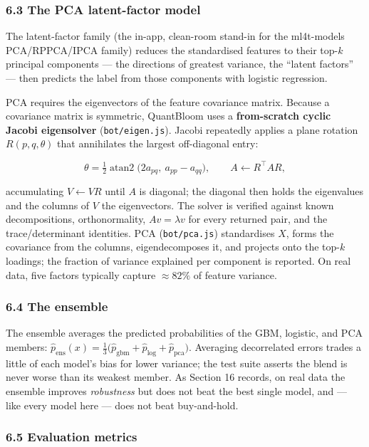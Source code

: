 \documentclass[
  11pt,
]{article}
\begin{document}
\subsubsection{6.3 The PCA latent-factor
model}\label{the-pca-latent-factor-model}

The latent-factor family (the in-app, clean-room stand-in for the
ml4t-models PCA/RPPCA/IPCA family) reduces the standardised features to
their top-\(k\) principal components --- the directions of greatest
variance, the ``latent factors'' --- then predicts the label from those
components with logistic regression.

PCA requires the eigenvectors of the feature covariance matrix. Because
a covariance matrix is symmetric, QuantBloom uses a \textbf{from-scratch
cyclic Jacobi eigensolver} (\texttt{bot/eigen.js}). Jacobi repeatedly
applies a plane rotation \(R(p,q,\theta)\) that annihilates the largest
off-diagonal entry:

\[
\theta = \tfrac{1}{2}\operatorname{atan2}\!\big(2a_{pq},\ a_{pp}-a_{qq}\big),\qquad
A \leftarrow R^\top A R,
\]

accumulating \(V \leftarrow VR\) until \(A\) is diagonal; the diagonal
then holds the eigenvalues and the columns of \(V\) the eigenvectors.
The solver is verified against known decompositions, orthonormality,
\(Av=\lambda v\) for every returned pair, and the trace/determinant
identities. PCA (\texttt{bot/pca.js}) standardises \(X\), forms the
covariance from the columns, eigendecomposes it, and projects onto the
top-\(k\) loadings; the fraction of variance explained per component is
reported. On real data, five factors typically capture \(\approx 82\%\)
of feature variance.

\subsubsection{6.4 The ensemble}\label{the-ensemble}

The ensemble averages the predicted probabilities of the GBM, logistic,
and PCA members:
\(\hat p_\text{ens}(x) = \tfrac{1}{3}\big(\hat p_\text{gbm} + \hat p_\text{log} + \hat p_\text{pca}\big)\).
Averaging decorrelated errors trades a little of each model's bias for
lower variance; the test suite asserts the blend is never worse than its
weakest member. As Section 16 records, on real data the ensemble
improves \emph{robustness} but does not beat the best single model, and
--- like every model here --- does not beat buy-and-hold.

\subsubsection{6.5 Evaluation metrics}\label{evaluation-metrics}
\end{document}
